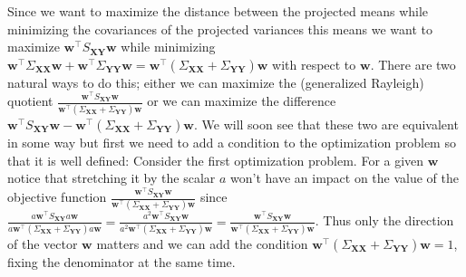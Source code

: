 \documentclass[a4paper, 12pt]{scrartcl}
\newcommand{\bfw}{\mathbf{w}}
\newcommand{\bfX}{\mathbf{X}}
\newcommand{\bfY}{\mathbf{Y}}
\begin{document}
Since we want to maximize the distance between the projected means while minimizing the covariances of the projected variances this means we want to maximize $\bfw^\intercal S_{\bfX\bfY}\bfw$ while minimizing $\bfw^\intercal\Sigma_{\bfX \bfX}\bfw + \bfw^\intercal\Sigma_{\bfY \bfY}\bfw = \bfw^\intercal\left(\Sigma_{\bfX \bfX}+\Sigma_{\bfY \bfY}\right)\bfw$ with respect to $\bfw$. There are two natural ways to do this; either we can maximize the (generalized Rayleigh) quotient $\frac{\bfw^\intercal S_{\bfX\bfY}\bfw}{\bfw^\intercal\left(\Sigma_{\bfX \bfX}+\Sigma_{\bfY \bfY}\right)\bfw}$ or we can maximize the difference $\bfw^\intercal S_{\bfX\bfY}\bfw-\bfw^\intercal\left(\Sigma_{\bfX \bfX}+\Sigma_{\bfY \bfY}\right)\bfw.$ We will soon see that these two are equivalent in some way but first we need to add a condition to the optimization problem so that it is well defined:
Consider the first optimization problem. For a given $\bfw$ notice that stretching it by the scalar $a$ won't have an impact on the value of the objective function $\frac{\bfw^\intercal S_{\bfX\bfY}\bfw}{\bfw^\intercal\left(\Sigma_{\bfX \bfX}+\Sigma_{\bfY \bfY}\right)\bfw}$ since $\frac{a\bfw^\intercal S_{\bfX\bfY}a\bfw}{a\bfw^\intercal\left(\Sigma_{\bfX \bfX}+\Sigma_{\bfY \bfY}\right)a\bfw}=\frac{a^2\bfw^\intercal S_{\bfX\bfY}\bfw}{a^2\bfw^\intercal\left(\Sigma_{\bfX \bfX}+\Sigma_{\bfY \bfY}\right)\bfw}=\frac{\bfw^\intercal S_{\bfX\bfY}\bfw}{\bfw^\intercal\left(\Sigma_{\bfX \bfX}+\Sigma_{\bfY \bfY}\right)\bfw}$. Thus only the direction of the vector $\bfw$ matters and we can add the condition $\bfw^\intercal\left(\Sigma_{\bfX \bfX}+\Sigma_{\bfY \bfY}\right)\bfw=1$, fixing the denominator at the same time.

\end{document}
